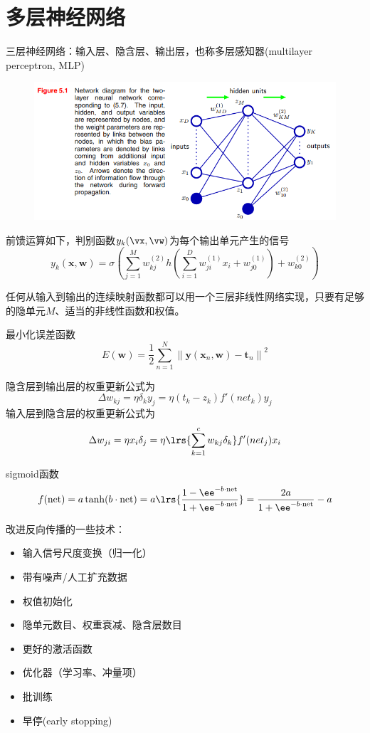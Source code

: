 
\section{多层神经网络} %

三层神经网络：输入层、隐含层、输出层，也称多层感知器(multilayer perceptron, MLP)
\begin{figure}[H]
\centering
\includegraphics[width=0.8\linewidth]{fig/forward_propagation.png}
\end{figure}

前馈运算如下，判别函数$y_k(\vx,\vw)$为每个输出单元产生的信号
\[y_{k}(\mathbf{x}, \mathbf{w})=\sigma\left(\sum_{j=1}^{M} w_{k j}^{(2)} h\left(\sum_{i=1}^{D} w_{j i}^{(1)} x_{i}+w_{j 0}^{(1)}\right)+w_{k 0}^{(2)}\right)\]

任何从输入到输出的连续映射函数都可以用一个三层非线性网络实现，只要有足够的隐单元$M$、适当的非线性函数和权值。

最小化误差函数
\[E(\mathbf{w})=\frac{1}{2} \sum_{n=1}^{N}\left\|\mathbf{y}\left(\mathbf{x}_{n}, \mathbf{w}\right)-\mathbf{t}_{n}\right\|^{2}\]

隐含层到输出层的权重更新公式为
\[\Delta w_{kj}=\eta\delta_k y_j=\eta(t_k-z_k)f'(net_k)y_j\]
输入层到隐含层的权重更新公式为
\[\Delta w_{ji}=\eta x_i\delta_j=\eta\lrs{\sum_{k=1}^c w_{kj}\delta_k}f'(net_j)x_i\]

sigmoid函数
\[f(\text{net})=a\tanh(b\cdot\text{net})=a\lrs{\frac{1-\ee^{-b\cdot \text{net}}}{1+\ee^{-b\cdot\text{net}}}}=\frac{2a}{1+\ee^{-b\cdot\text{net}}}-a\]

改进反向传播的一些技术：
\begin{itemize}
	\item 输入信号尺度变换（归一化）
	\item 带有噪声/人工扩充数据
	\item 权值初始化
	\item 隐单元数目、权重衰减、隐含层数目
	\item 更好的激活函数
	\item 优化器（学习率、冲量项）
	\item 批训练
	\item 早停(early stopping)
\end{itemize}